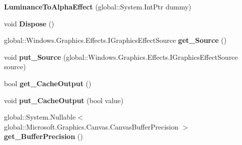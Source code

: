 \begin{DoxyCompactItemize}
{\bfseries Luminance\+To\+Alpha\+Effect} (global\+::\+System.\+Int\+Ptr dummy)
\item 
\mbox{\label{class_microsoft_1_1_graphics_1_1_canvas_1_1_effects_1_1_luminance_to_alpha_effect_a85340fa4f5ed911e337aa537dbdb858b}} 
void {\bfseries Dispose} ()
\item 
\mbox{\label{class_microsoft_1_1_graphics_1_1_canvas_1_1_effects_1_1_luminance_to_alpha_effect_a4e49df080f648a6f85452c155c52125c}} 
global\+::\+Windows.\+Graphics.\+Effects.\+I\+Graphics\+Effect\+Source {\bfseries get\+\_\+\+Source} ()
\item 
\mbox{\label{class_microsoft_1_1_graphics_1_1_canvas_1_1_effects_1_1_luminance_to_alpha_effect_a7e09359a7b7b056a5f57bd696445520c}} 
void {\bfseries put\+\_\+\+Source} (global\+::\+Windows.\+Graphics.\+Effects.\+I\+Graphics\+Effect\+Source source)
\item 
\mbox{\label{class_microsoft_1_1_graphics_1_1_canvas_1_1_effects_1_1_luminance_to_alpha_effect_aba5fe8d0447a282598e09b79e98c43f6}} 
bool {\bfseries get\+\_\+\+Cache\+Output} ()
\item 
\mbox{\label{class_microsoft_1_1_graphics_1_1_canvas_1_1_effects_1_1_luminance_to_alpha_effect_a751ac74aa31e7ea281f4afc87961937a}} 
void {\bfseries put\+\_\+\+Cache\+Output} (bool value)
\item 
\mbox{\label{class_microsoft_1_1_graphics_1_1_canvas_1_1_effects_1_1_luminance_to_alpha_effect_a3d1882c32964391396f12501f536883e}} 
global\+::\+System.\+Nullable$<$ global\+::\+Microsoft.\+Graphics.\+Canvas.\+Canvas\+Buffer\+Precision $>$ {\bfseries get\+\_\+\+Buffer\+Precision} ()
\item 
\mbox{\label{class_microsoft_1_1_graphics_1_1_canvas_1_1_effects_1_1_luminance_to_alpha_effect_af64e97bc961f69eb5b9e973f35b6555a}} 

\end{DoxyCompactItemize}
